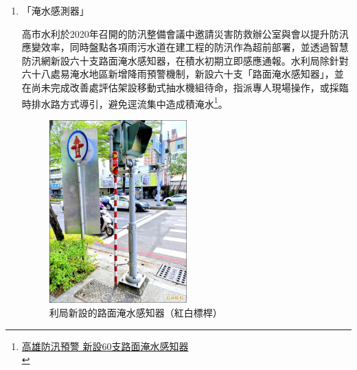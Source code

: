\documentclass[a4paper,12pt]{article}
\begin{document}
\begin{enumerate}
\begin{enumerate}
\item 「淹水感測器」
\label{sec:org856f6d0}

高市水利於2020年召開的防汛整備會議中邀請災害防救辦公室與會以提升防汛應變效率，同時盤點各項雨污水道在建工程的防汛作為超前部署，並透過智慧防汛網新設六十支路面淹水感知器，在積水初期立即感應通報。水利局除針對六十八處易淹水地區新增降雨預警機制，新設六十支「路面淹水感知器」，並在尚未完成改善處評估架設移動式抽水機組待命，指派專人現場操作，或採臨時排水路方式導引，避免逕流集中造成積淹水\footnote{\href{https://news.ltn.com.tw/news/life/paper/1366448}{高雄防汛預警 新設60支路面淹水感知器}\\}。\\

\begin{figure}[htbp]
\centering
\includegraphics[width=200]{images/ks218.jpg}
\caption{\label{fig:FigName}利局新設的路面淹水感知器（紅白標桿）}
\end{figure}


\end{enumerate}
\end{enumerate}
\end{document}
